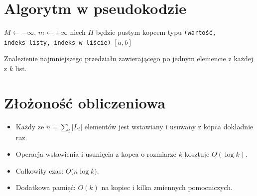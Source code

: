 \documentclass[a4paper,12pt]{article}
\begin{document}
\section*{Algorytm w pseudokodzie}
\begin{algorithm}[H]
  \BlankLine
  $M \leftarrow -\infty$, $m \leftarrow +\infty$\;
  niech $H$ będzie pustym kopcem typu \texttt{(wartość, indeks\_listy, indeks\_w\_liście)}\;
  \Return $[a,b]$\;
  \caption{Znalezienie najmniejszego przedziału zawierającego po jednym elemencie z każdej z $k$ list.}
\end{algorithm}

\section*{Złożoność obliczeniowa}
\begin{itemize}
  \item Każdy ze $n = \sum_i |L_i|$ elementów jest wstawiany i usuwany z kopca dokładnie raz.
  \item Operacja wstawienia i usunięcia z kopca o rozmiarze $k$ kosztuje $O(\log k)$.
  \item Całkowity czas: $\displaystyle O\bigl(n \log k\bigr)$.
  \item Dodatkowa pamięć: $O(k)$ na kopiec i kilka zmiennych pomocniczych.
\end{itemize}
\end{document}
